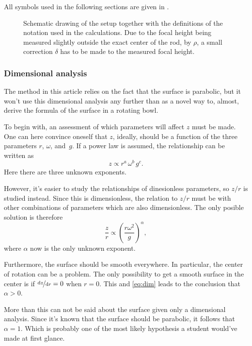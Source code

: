 \documentclass[11pt,
a4paper, 
swedish, english]{article}
\begin{document}
All symbols used in the following sections are given in
. 

\begin{figure}\centering
\resizebox{.6\linewidth}{!}{}
\caption{Schematic drawing of the setup together with the definitions
  of the notation used in the calculations. Due to the focal height
  being measured slightly outside the exact center of the rod, by
  $\rho$, a small correction $\delta$ has to be made to the measured
  focal height.} 
\label{fig:rot_bowl} 
\end{figure}

\subsubsection{Dimensional analysis}
The method in this article relies on the fact that the surface is
parabolic, but it won't use this dimensional analysis any further than
as a novel way to, almost, derive the formula of the surface in a
rotating bowl. 

To begin with, an assessment of which parameters will affect $z$ must
be made. One can here convince oneself that $z$, ideally, should be a
function of the three parameters $r$, $\omega$, and~$g$. If a power
law is assumed, the relationship can be written as
\begin{equation}
z\propto r^a\, \omega^b\, g^c.
\end{equation}
Here there are three unknown exponents.

However, it's easier to study the relationships of dinesionless
parameters, so $z/r$ is studied instead. Since this is dimensionless,
the relation to $z/r$ must be with other combinations of parameters
which are also dimensionless. The only posible solution is therefore
\begin{equation}\label{eq:dim}
\frac{z}{r} \propto \left(\frac{r\omega^2}{g}\right)^\alpha, 
\end{equation}
where $\alpha$ now is the only unknown exponent.

Furthermore, the surface should be smooth everywhere. In particular,
the center of rotation can be a problem. The only possibility to get a
smooth surface in the center is if $\nicefrac{\mathrm{d}{z}}{\mathrm{d}{r}}=0$ when
$r=0$. This and \eqref{eq:dim} leads to the conclusion that $\alpha>0$.

More than this can not be said about the surface given only a
dimensional analysis. Since it's known that the surface should be
parabolic, it follows that $\alpha=1$. 
Which is probably one of the most likely hypothesis a student would've
made at first glance.  
\end{document}
